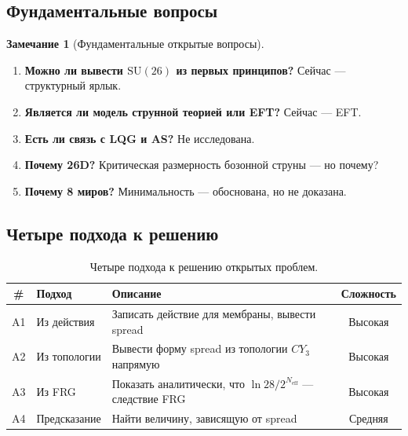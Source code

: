 \documentclass[11pt,a4paper]{article}
\newcommand{\SU}{\mathrm{SU}}
\newcommand{\CY}{CY_3}
\newcommand{\Neff}{N_{\text{eff}}}
\theoremstyle{definition}
\newtheorem{remark}[theorem]{Замечание}
\begin{document}
\subsection{Фундаментальные вопросы}
\label{subsec:fundamental-questions}

\begin{remark}[Фундаментальные открытые вопросы]
\label{rem:fundamental-questions}
\begin{enumerate}
    \item \textbf{Можно ли вывести $\SU(26)$ из первых принципов?} 
          Сейчас — структурный ярлык.
    \item \textbf{Является ли модель струнной теорией или EFT?} 
          Сейчас — EFT.
    \item \textbf{Есть ли связь с LQG и AS?} Не исследована.
    \item \textbf{Почему 26D?} Критическая размерность 
          бозонной струны — но почему?
    \item \textbf{Почему 8 миров?} Минимальность — обоснована, 
          но не доказана.
\end{enumerate}
\end{remark}

\subsection{Четыре подхода к решению}
\label{subsec:four-approaches}

\begin{table}[htbp]
\centering
\caption{Четыре подхода к решению открытых проблем.}
\label{tab:four-approaches}
\begin{tabular}{clp{5cm}c}
\toprule
\# & Подход & Описание & Сложность \\
\midrule
A1 & Из действия & Записать действие для мембраны, 
    вывести spread & Высокая \\[0.3em]
A2 & Из топологии & Вывести форму spread из топологии 
    $\CY$ напрямую & Высокая \\[0.3em]
A3 & Из FRG & Показать аналитически, что $\ln 28/2^{\Neff}$ 
    — следствие FRG & Высокая \\[0.3em]
A4 & Предсказание & Найти величину, зависящую от spread & 
    Средняя \\
\bottomrule
\end{tabular}
\end{table}
\end{document}
